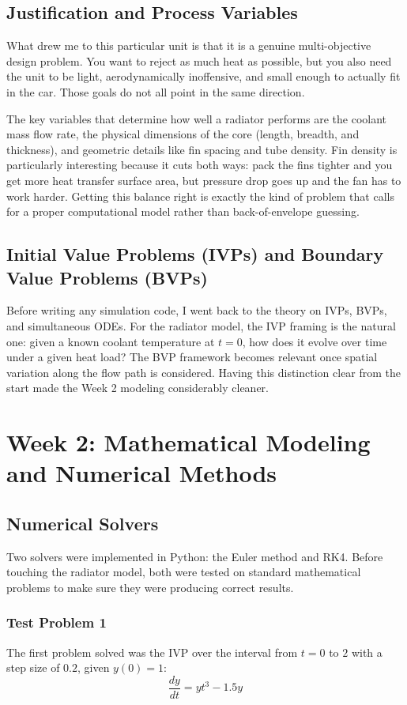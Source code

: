\documentclass[12pt, a4paper]{article}
\begin{document}
\subsection{Justification and Process Variables}
What drew me to this particular unit is that it is a genuine multi-objective design problem. You want to reject as much heat as possible, but you also need the unit to be light, aerodynamically inoffensive, and small enough to actually fit in the car. Those goals do not all point in the same direction.

The key variables that determine how well a radiator performs are the coolant mass flow rate, the physical dimensions of the core (length, breadth, and thickness), and geometric details like fin spacing and tube density. Fin density is particularly interesting because it cuts both ways: pack the fins tighter and you get more heat transfer surface area, but pressure drop goes up and the fan has to work harder. Getting this balance right is exactly the kind of problem that calls for a proper computational model rather than back-of-envelope guessing.

\subsection{Initial Value Problems (IVPs) and Boundary Value Problems (BVPs)}
Before writing any simulation code, I went back to the theory on IVPs, BVPs, and simultaneous ODEs. For the radiator model, the IVP framing is the natural one: given a known coolant temperature at $t = 0$, how does it evolve over time under a given heat load? The BVP framework becomes relevant once spatial variation along the flow path is considered. Having this distinction clear from the start made the Week 2 modeling considerably cleaner.

\section{Week 2: Mathematical Modeling and Numerical Methods}

\subsection{Numerical Solvers}
Two solvers were implemented in Python: the Euler method and RK4. Before touching the radiator model, both were tested on standard mathematical problems to make sure they were producing correct results.

\subsubsection{Test Problem 1}
The first problem solved was the IVP over the interval from $t = 0$ to $2$ with a step size of $0.2$, given $y(0) = 1$:
\begin{equation}
    \frac{dy}{dt} = y t^3 - 1.5y
\end{equation}
\end{document}
